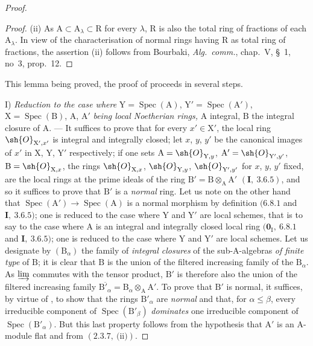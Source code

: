 \begin{proof}
\begin{proof}

(ii) As $\mathrm{A}\subset\mathrm{A}_\lambda\subset\mathrm{R}$ for every $\lambda$, $\mathrm{R}$ is also the total ring of fractions of each $\mathrm{A}_\lambda$.
In view of the characterisation of normal rings having $\mathrm{R}$ as total ring of fractions,
the assertion (ii) follows from Bourbaki, \emph{Alg.~comm.}, chap.~V,
\S~1, no~3, prop.~12.
\end{proof}

This lemma being proved, the proof of  proceeds in several steps.

I) \emph{Reduction to the case where} $\mathrm{Y}=\operatorname{Spec}(\mathrm{A})$, $\mathrm{Y}'=\operatorname{Spec}(\mathrm{A}')$, $\mathrm{X}=\operatorname{Spec}(\mathrm{B})$, $\mathrm{A}$, $\mathrm{A}'$ \emph{being
local Noetherian rings,} $\mathrm{A}$ integral, $\mathrm{B}$ the integral closure of $\mathrm{A}$. --- It suffices to prove that
for every $x'\in\mathrm{X}'$, the local ring $\sh{O}_{\mathrm{X}',x'}$ is integral and integrally closed; let $x$, $y$, $y'$
be the canonical images of $x'$ in $\mathrm{X}$, $\mathrm{Y}$, $\mathrm{Y}'$ respectively; if one sets $\mathrm{A}=\sh{O}_{\mathrm{Y},y}$,
$\mathrm{A}'=\sh{O}_{\mathrm{Y}',y'}$, $\mathrm{B}=\sh{O}_{\mathrm{X},x}$, the rings $\sh{O}_{\mathrm{X},x}$, $\sh{O}_{\mathrm{Y},y}$, $\sh{O}_{\mathrm{Y}',y'}$ for $x$, $y$, $y'$ fixed, are the local rings at the
prime ideals of the ring $\mathrm{B}'=\mathrm{B}\otimes_\mathrm{A}\mathrm{A}'$ $(\mathbf{I},~3.6.5)$, and so it suffices to prove that $\mathrm{B}'$
is a \emph{normal} ring. Let us note on the other hand that $\operatorname{Spec}(\mathrm{A}')\to\operatorname{Spec}(\mathrm{A})$ is a normal
morphism by definition $(6.8.1$ and $\mathbf{I},~3.6.5)$; one is reduced to the case where $\mathrm{Y}$ and $\mathrm{Y}'$ are
local schemes, that is to say to the case where $\mathrm{A}$ is an integral and integrally
closed local ring $(\mathbf{0}_\mathrm{I},~6.8.1$ and $\mathbf{I},~3.6.5)$; one is reduced to the case where $\mathrm{Y}$ and $\mathrm{Y}'$
are local schemes. Let us designate by $(\mathrm{B}_\alpha)$ the family of \emph{integral closures} of the sub-$\mathrm{A}$-algebras \emph{of finite type} of $\mathrm{B}$;
it is clear that $\mathrm{B}$ is the union of the filtered increasing family of the $\mathrm{B}_\alpha$. As $\varinjlim$
commutes with the tensor product, $\mathrm{B}'$ is therefore also the union of the filtered increasing family
$\overline{\mathrm{B}'_\alpha}=\mathrm{B}_\alpha\otimes_\mathrm{A}\mathrm{A}'$. To prove that $\mathrm{B}'$ is normal, it suffices, by virtue of , to
show that the rings $\mathrm{B}'_\alpha$ are \emph{normal} and that, for $\alpha\leqslant\beta$, every irreducible component
of $\operatorname{Spec}(\mathrm{B}'_\beta)$ \emph{dominates} one irreducible component of $\operatorname{Spec}(\mathrm{B}'_\alpha)$. But this
last property follows from the hypothesis that $\mathrm{A}'$ is an $\mathrm{A}$-module flat and from $(2.3.7,~\text{(ii)})$.


\end{proof}
